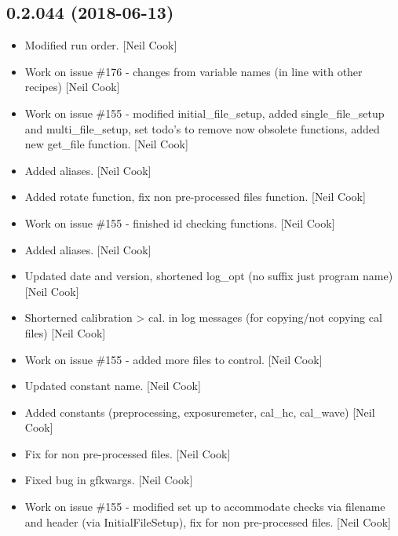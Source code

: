 \documentclass[a4paper,10pt,english]{report}
\begin{document}
\subsection{0.2.044 (2018-06-13)}
\label{\detokenize{misc/changelog:id420}}\begin{itemize}
\item {} 
Modified run order. {[}Neil Cook{]}

\item {} 
Work on issue \#176 - changes from variable names (in line with other
recipes) {[}Neil Cook{]}

\item {} 
Work on issue \#155 - modified initial\_file\_setup, added
single\_file\_setup and multi\_file\_setup, set todo’s to remove now
obsolete functions, added new get\_file function. {[}Neil Cook{]}

\item {} 
Added aliases. {[}Neil Cook{]}

\item {} 
Added rotate function, fix non pre-processed files function. {[}Neil
Cook{]}

\item {} 
Work on issue \#155 - finished id checking functions. {[}Neil Cook{]}

\item {} 
Added aliases. {[}Neil Cook{]}

\item {} 
Updated date and version, shortened log\_opt (no suffix just program
name) {[}Neil Cook{]}

\item {} 
Shorterned calibration \textendash{}\textgreater{} cal. in log messages (for copying/not
copying cal files) {[}Neil Cook{]}

\item {} 
Work on issue \#155 - added more files to control. {[}Neil Cook{]}

\item {} 
Updated constant name. {[}Neil Cook{]}

\item {} 
Added constants (preprocessing, exposuremeter, cal\_hc, cal\_wave) {[}Neil
Cook{]}

\item {} 
Fix for non pre-processed files. {[}Neil Cook{]}

\item {} 
Fixed bug in gfkwargs. {[}Neil Cook{]}

\item {} 
Work on issue \#155 - modified set up to accommodate checks via
filename and header (via InitialFileSetup), fix for non pre-processed
files. {[}Neil Cook{]}


\end{itemize}
\end{document}
